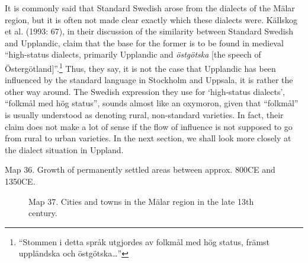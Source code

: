 It is commonly said that Standard Swedish arose from the dialects of the Mälar region, but it is often not made clear exactly which these dialects were. Källskog et al. (1993: 67), in their discussion of the similarity between Standard Swedish and Upplandic, claim that the base for the former is to be found in medieval “high-status dialects, primarily Upplandic and \textit{östgötska} [the speech of Östergötland]”.\footnote{ “Stommen i detta språk utgjordes av folkmål med hög status, främst uppländska och östgötska…”} Thus, they say, it is not the case that Upplandic has been influenced by the standard language in Stockholm and Uppsala, it is rather the other way around. The Swedish expression they use for ‘high-status dialects’, “folkmål med hög status”, sounds almost like an oxymoron, given that “folkmål” is usually understood as denoting rural, non-standard varieties. In fact, their claim does not make a lot of sense if the flow of influence is not supposed to go from rural to urban varieties. In the next section, we shall look more closely at the dialect situation in Uppland.

\clearpage%
Map 36. Growth of permanently  settled areas between\newline
approx. 800CE and 1350CE.



\begin{figure}[h]
\centering
\begin{minipage}{3.04167in}
\label{bkm:Ref177899651}Map 37. Cities and towns in the Mälar region\newline
 in the late 13th century.

\end{minipage}
\end{figure}
\clearpage%



